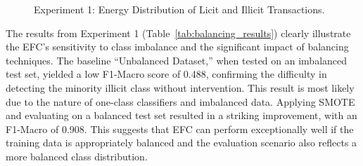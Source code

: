 \documentclass[12pt]{article}
\begin{document}
\begin{figure}[!tph]
  \centering
  \caption{Experiment 1: Energy Distribution of Licit and Illicit Transactions.}
  \label{fig:histexp1}
\end{figure}

The results from Experiment 1 (Table~\ref{tab:balancing_results}) clearly illustrate the EFC's sensitivity to class imbalance
and the significant impact of balancing techniques. The baseline ``Unbalanced Dataset,'' when tested on an imbalanced test
set, yielded a low F1-Macro score of 0.488, confirming the difficulty in detecting the minority illicit class without
intervention. This result is most likely due to the nature of one-class classifiers and imbalanced data. Applying SMOTE
and evaluating on a balanced test set resulted in a striking improvement, with an F1-Macro of 0.908. This suggests that
EFC can perform exceptionally well if the training data is appropriately balanced and the evaluation scenario also reflects
a more balanced class distribution. 
\end{document}
